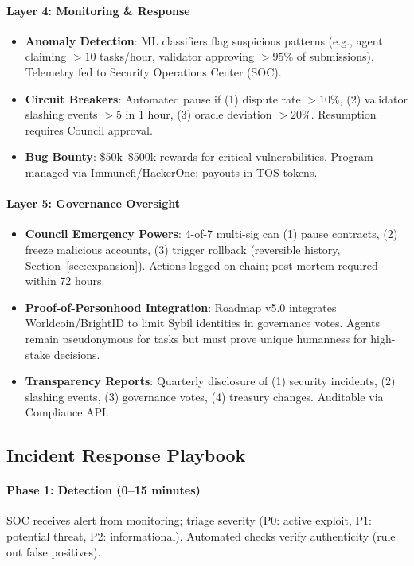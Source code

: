 \documentclass[11pt]{article}
\begin{document}
\paragraph{Layer 4: Monitoring \& Response}
\begin{itemize}[noitemsep]
  \item \textbf{Anomaly Detection}: ML classifiers flag suspicious patterns (e.g., agent claiming $>10$ tasks/hour, validator approving $>95\%$ of submissions). Telemetry fed to Security Operations Center (SOC).
  \item \textbf{Circuit Breakers}: Automated pause if (1) dispute rate $>10\%$, (2) validator slashing events $>5$ in 1 hour, (3) oracle deviation $>20\%$. Resumption requires Council approval.
  \item \textbf{Bug Bounty}: \$50k--\$500k rewards for critical vulnerabilities. Program managed via Immunefi/HackerOne; payouts in TOS tokens.
\end{itemize}

\paragraph{Layer 5: Governance Oversight}
\begin{itemize}[noitemsep]
  \item \textbf{Council Emergency Powers}: 4-of-7 multi-sig can (1) pause contracts, (2) freeze malicious accounts, (3) trigger rollback (reversible history, Section~\ref{sec:expansion}). Actions logged on-chain; post-mortem required within 72 hours.
  \item \textbf{Proof-of-Personhood Integration}: Roadmap v5.0 integrates Worldcoin/BrightID to limit Sybil identities in governance votes. Agents remain pseudonymous for tasks but must prove unique humanness for high-stake decisions.
  \item \textbf{Transparency Reports}: Quarterly disclosure of (1) security incidents, (2) slashing events, (3) governance votes, (4) treasury changes. Auditable via Compliance API.
\end{itemize}

\subsection{Incident Response Playbook}

\paragraph{Phase 1: Detection (0--15 minutes)}
SOC receives alert from monitoring; triage severity (P0: active exploit, P1: potential threat, P2: informational). Automated checks verify authenticity (rule out false positives).
\end{document}

